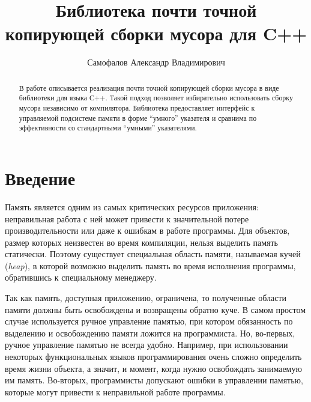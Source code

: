 \title{Библиотека почти точной копирующей сборки мусора для C++}


\author{Самофалов Александр Владимирович}



\maketitle             

\begin{abstract}
В работе описывается реализация почти точной копирующей сборки мусора
в виде библиотеки для языка С++. Такой подход позволяет избирательно 
использовать сборку мусора независимо от компилятора. Библиотека 
предоставляет интерфейс к управляемой подсистеме памяти в форме
``умного'' указателя и сравнима по эффективности со стандартными
``умными'' указателями.
\end{abstract}

\section*{Введение}
Память является одним из самых критических ресурсов приложения: неправильная работа с ней
может привести к значительной потере производительности или даже к ошибкам в
работе программы. Для объектов, размер которых неизвестен во время компиляции, нельзя выделить память статически. Поэтому существует специальная область памяти, называемая кучей (\textit{heap}),
в которой возможно выделить память во время исполнения программы, обратившись к специальному менеджеру.

Так как память, доступная приложению, ограничена, то полученные области памяти должны быть освобождены и возвращены обратно куче. В самом простом случае используется ручное управление памятью, при котором обязанность по выделению и освобождению памяти ложится на программиста. Но, во-первых, ручное управление памятью не всегда удобно.
Например, при использовании некоторых функциональных языков программирования очень сложно
определить время жизни объекта, а значит, и момент, когда нужно освобождать занимаемую им память. Во-вторых, программисты допускают ошибки в управлении памятью,
которые могут привести к неправильной работе программы. 

